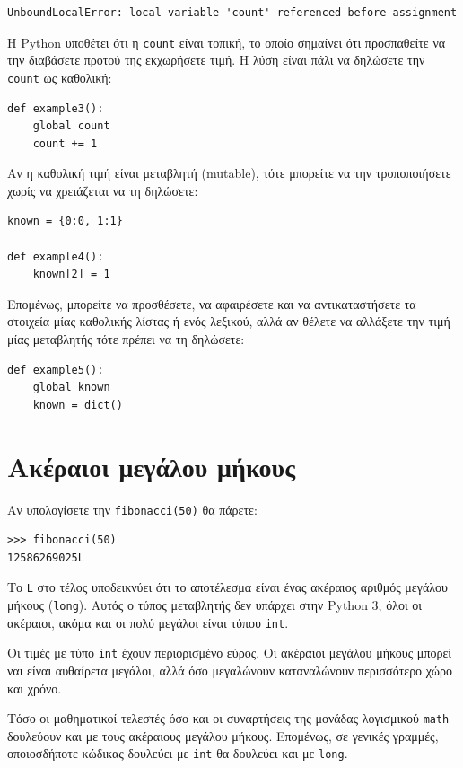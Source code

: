 \documentclass[10pt]{book}
\begin{document}
\begin{verbatim}
UnboundLocalError: local variable 'count' referenced before assignment
\end{verbatim}
%
Η Python υποθέτει ότι η {\tt count} είναι τοπική, το οποίο σημαίνει ότι προσπαθείτε να την διαβάσετε προτού της εκχωρήσετε τιμή. Η λύση είναι πάλι να δηλώσετε την {\tt count} ως καθολική:

\begin{verbatim}
def example3():
    global count
    count += 1
\end{verbatim}
%
Αν η καθολική τιμή είναι μεταβλητή (mutable), τότε μπορείτε να την τροποποιήσετε χωρίς να χρειάζεται να τη δηλώσετε:

\begin{verbatim}
known = {0:0, 1:1}

def example4():
    known[2] = 1
\end{verbatim}
%
Επομένως, μπορείτε να προσθέσετε, να αφαιρέσετε και να αντικαταστήσετε τα στοιχεία μίας καθολικής λίστας ή ενός λεξικού, αλλά αν θέλετε να αλλάξετε την τιμή μίας μεταβλητής τότε πρέπει να τη δηλώσετε:

\begin{verbatim}
def example5():
    global known
    known = dict()
\end{verbatim}
%

 
\section{Ακέραιοι μεγάλου μήκους}

Αν υπολογίσετε την {\tt fibonacci(50)} θα πάρετε:

\begin{verbatim}
>>> fibonacci(50)
12586269025L
\end{verbatim}
%
Το {\tt L} στο τέλος υποδεικνύει ότι το αποτέλεσμα είναι ένας ακέραιος αριθμός μεγάλου μήκους ({\tt long}). Αυτός ο τύπος μεταβλητής δεν υπάρχει στην Python 3, όλοι οι ακέραιοι, ακόμα και οι πολύ μεγάλοι είναι τύπου {\tt int}.

Οι τιμές με τύπο {\tt int} έχουν περιορισμένο εύρος. Οι ακέραιοι μεγάλου μήκους μπορεί ναι είναι αυθαίρετα μεγάλοι, αλλά όσο μεγαλώνουν καταναλώνουν περισσότερο χώρο και χρόνο.

Τόσο οι μαθηματικοί τελεστές όσο και οι συναρτήσεις της μονάδας λογισμικού {\tt math} δουλεύουν και με τους ακέραιους μεγάλου μήκους. Επομένως, σε γενικές γραμμές, οποιοσδήποτε κώδικας δουλεύει με {\tt int} θα δουλεύει και με
{\tt long}.
\end{document}
